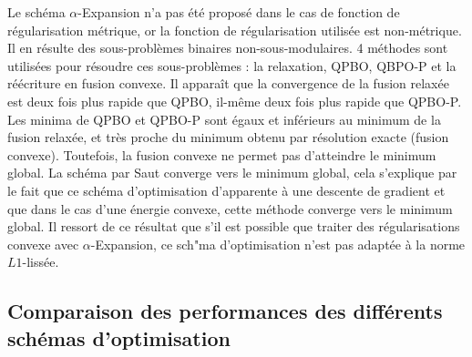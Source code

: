 \documentclass[../main/These_Mathias_Paget.tex]{subfiles}
\begin{document}
Le schéma $\alpha$-Expansion n'a pas été proposé dans le cas de fonction de régularisation métrique, or la fonction de régularisation utilisée est non-métrique. Il en résulte des sous-problèmes binaires non-sous-modulaires. 4 méthodes sont utilisées pour résoudre ces sous-problèmes : la relaxation, QPBO, QBPO-P et la réécriture en fusion convexe. Il apparaît que la convergence de la fusion relaxée est deux fois plus rapide que QPBO, il-même deux fois plus rapide que QPBO-P. Les minima de QPBO et QPBO-P sont égaux et inférieurs au minimum de la fusion relaxée, et très proche du minimum obtenu par résolution exacte (fusion convexe). Toutefois, la fusion convexe ne permet pas d'atteindre le minimum global. La schéma par Saut converge vers le minimum global, cela s'explique par le fait que ce schéma d'optimisation d'apparente à une descente de gradient et que dans le cas d'une énergie convexe, cette méthode converge vers le minimum global. Il ressort de ce résultat que s'il est possible que traiter des régularisations convexe avec $\alpha$-Expansion, ce sch"ma d'optimisation n'est pas adaptée à la norme $L1$-lissée.

\subsection{Comparaison des performances des différents schémas d'optimisation}
\end{document}
